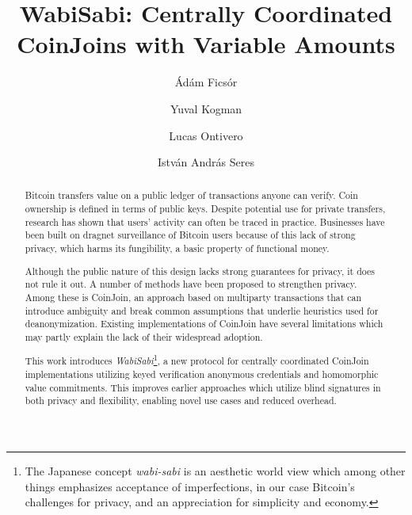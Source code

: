 \documentclass[a4paper]{article}
\begin{document}
\title{WabiSabi: Centrally Coordinated CoinJoins with Variable Amounts}
\author[1]{Ádám Ficsór}
\author[1]{Yuval Kogman}
\author[1]{Lucas Ontivero}
\author[2]{István András Seres}
\date{}
\maketitle

\begin{abstract}
Bitcoin transfers value on a public ledger of transactions anyone can verify. Coin ownership is defined in terms of public keys.
Despite potential use for private transfers, research has shown that users' activity can often be traced in practice. Businesses have been built on dragnet surveillance of Bitcoin users because of this lack of strong privacy, which harms its fungibility, a basic property of functional money.

Although the public nature of this design lacks strong guarantees for privacy, it does not rule it out.
A number of methods have been proposed to strengthen privacy. Among these is CoinJoin, an approach based on multiparty transactions that can introduce ambiguity and break common assumptions that underlie heuristics used for deanonymization.
Existing implementations of CoinJoin have several limitations which may partly explain the lack of their widespread adoption.

This work introduces \emph{WabiSabi}\footnote{The Japanese concept \emph{wabi-sabi} is an aesthetic world view which among other things emphasizes acceptance of imperfections, in our case Bitcoin's challenges for privacy, and an appreciation for simplicity and economy.}, a new protocol for centrally coordinated CoinJoin implementations utilizing keyed verification anonymous credentials and homomorphic value commitments. This improves earlier approaches which utilize blind signatures in both privacy and flexibility, enabling novel use cases and reduced overhead.
\end{abstract}
\end{document}
